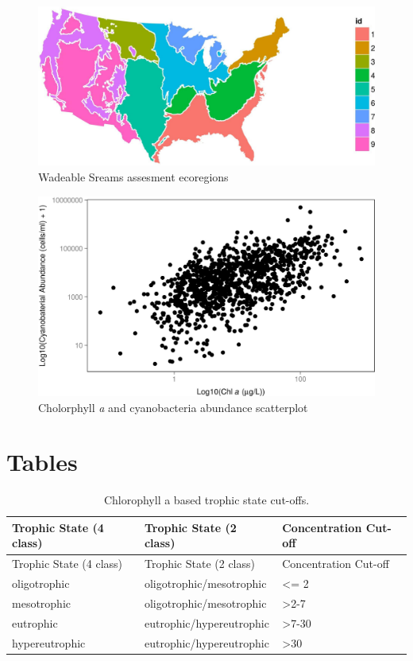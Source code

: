 \documentclass[11pt,]{article}
\begin{document}
\begin{figure}[htbp]
\centering
\includegraphics{manuscript_files/figure-latex/ecoregion_map-1.jpeg}
\caption{Wadeable Sreams assesment ecoregions \label{fig:ecoregion_map}}
\end{figure}

\newpage

\begin{figure}[htbp]
\centering
\includegraphics{manuscript_files/figure-latex/chla_cyano_scatterplot-1.jpeg}
\caption{Cholorphyll \emph{a} and cyanobacteria abundance
scatterplot\label{fig:scatterplot}}
\end{figure}

\newpage

\section{Tables}\label{tables}

\begin{longtable}[c]{@{}lll@{}}
\caption{Chlorophyll a based trophic state cut-offs.
\label{tab:trophicStateTable}}\tabularnewline
\toprule
Trophic State (4 class) & Trophic State (2 class) & Concentration
Cut-off\tabularnewline
\midrule
\endfirsthead
\toprule
Trophic State (4 class) & Trophic State (2 class) & Concentration
Cut-off\tabularnewline
\midrule
\endhead
oligotrophic & oligotrophic/mesotrophic & \textless{}= 2\tabularnewline
mesotrophic & oligotrophic/mesotrophic &
\textgreater{}2-7\tabularnewline
eutrophic & eutrophic/hypereutrophic & \textgreater{}7-30\tabularnewline
hypereutrophic & eutrophic/hypereutrophic &
\textgreater{}30\tabularnewline
\bottomrule
\end{longtable}
\end{document}
